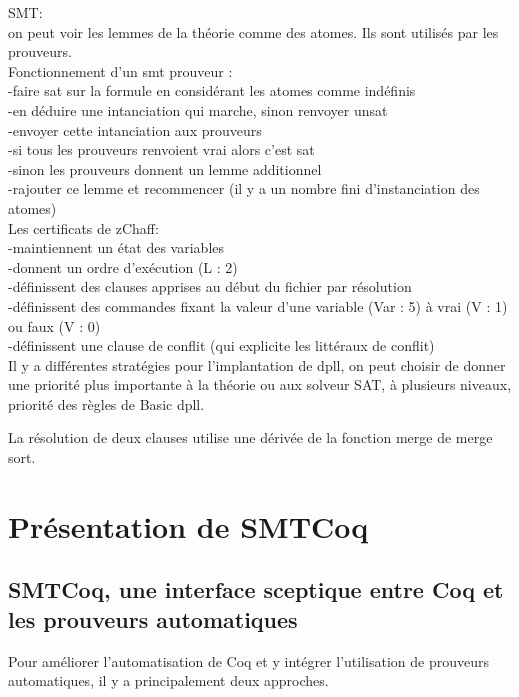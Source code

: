 \documentclass{article}
\begin{document}
SMT: \\
on peut voir les lemmes de la théorie comme des atomes. Ils sont utilisés par les prouveurs. \\
Fonctionnement d'un smt prouveur :\\
-faire sat sur la formule en considérant les atomes comme indéfinis \\
-en déduire une intanciation qui marche, sinon renvoyer unsat \\
-envoyer cette intanciation aux prouveurs \\
-si tous les prouveurs renvoient vrai alors c'est sat \\
-sinon les prouveurs donnent un lemme additionnel \\
-rajouter ce lemme et recommencer (il y a un nombre fini d'instanciation des atomes)\\ 



Les certificats de zChaff:\\
-maintiennent un état des variables \\
-donnent un ordre d'exécution (L : 2) \\
-définissent des clauses apprises au début du fichier par résolution \\
-définissent des commandes fixant la valeur d'une variable (Var : 5) à vrai (V : 1) ou faux (V : 0) \\
-définissent une clause de conflit (qui explicite les littéraux de conflit)\\

Il y a différentes stratégies pour l'implantation de dpll, on peut choisir de donner une priorité plus importante à la théorie ou aux solveur SAT, à plusieurs niveaux, priorité des règles de Basic dpll. 

La résolution de deux clauses utilise une dérivée de la fonction merge de merge sort.

\newpage 
\section{Présentation de SMTCoq}

\subsection{SMTCoq, une interface sceptique entre Coq et les prouveurs automatiques}

Pour améliorer l'automatisation de Coq et y intégrer l'utilisation de prouveurs automatiques, il y a principalement deux approches.
\end{document}
